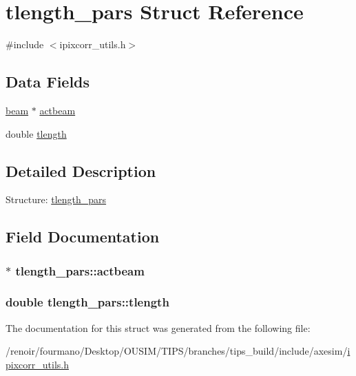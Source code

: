 \hypertarget{structtlength__pars}{
\section{tlength\_\-pars Struct Reference}
\label{structtlength__pars}
}


{\ttfamily \#include $<$ipixcorr\_\-utils.h$>$}\subsection*{Data Fields}
\begin{DoxyCompactItemize}
\item 
\hyperlink{structbeam}{beam} $\ast$ \hyperlink{structtlength__pars_aa407253036242c48d9966676885f0cde}{actbeam}
\item 
double \hyperlink{structtlength__pars_ae4abb3d406e407e652aa41015f12521d}{tlength}
\end{DoxyCompactItemize}


\subsection{Detailed Description}
Structure: \hyperlink{structtlength__pars}{tlength\_\-pars} 

\subsection{Field Documentation}
\hypertarget{structtlength__pars_aa407253036242c48d9966676885f0cde}{
\subsubsection[{actbeam}]{$\ast$ {\bf tlength\_\-pars::actbeam}}}
\label{structtlength__pars_aa407253036242c48d9966676885f0cde}
\hypertarget{structtlength__pars_ae4abb3d406e407e652aa41015f12521d}{
\subsubsection[{tlength}]{\setlength{\rightskip}{0pt plus 5cm}double {\bf tlength\_\-pars::tlength}}}
\label{structtlength__pars_ae4abb3d406e407e652aa41015f12521d}


The documentation for this struct was generated from the following file:\begin{DoxyCompactItemize}
\item 
/renoir/fourmano/Desktop/OUSIM/TIPS/branches/tips\_\-build/include/axesim/\hyperlink{ipixcorr__utils_8h}{ipixcorr\_\-utils.h}\end{DoxyCompactItemize}
